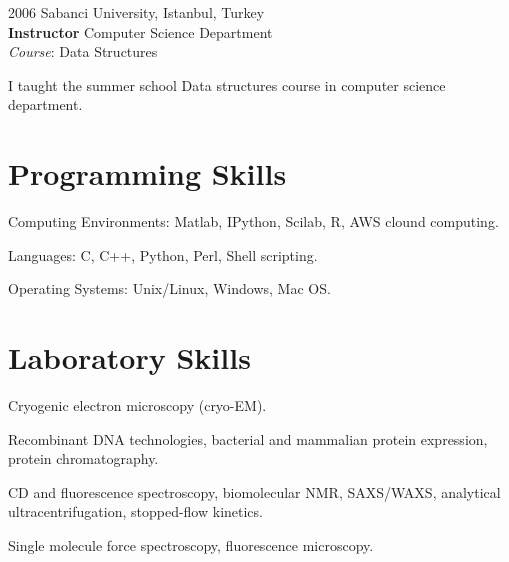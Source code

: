 \documentclass[12pt,letterpaper]{report}
\newcommand{\listitemspace}{0.25em}
\renewenvironment{itemize}
{\begin{list}{}{\setlength{\leftmargin}{0em}
                \setlength{\parskip}{0em}
                \setlength{\itemsep}{\listitemspace}
                \setlength{\parsep}{\listitemspace}}}
{\end{list}}
\begin{document}
\begin{tablist}
        \item[2006]\tab{}Sabanci University, Istanbul, Turkey \\
                             \textbf{Instructor} Computer Science Department\\
                             \textit{Course}: Data Structures
                             \begin{itemize}
                                \item \textbullet \hspace{0.2cm} I taught the summer school Data structures course in computer science department.
                            \end{itemize}

    \end{tablist}



    \section*{Programming Skills}
    \begin{itemize}
        \item \textbullet \hspace{0.2cm} Computing Environments: Matlab, IPython, Scilab, R, AWS clound computing.
        \item \textbullet \hspace{0.2cm} Languages: C, C++, Python, Perl, Shell scripting.
        \item \textbullet \hspace{0.2cm} Operating Systems: Unix/Linux, Windows, Mac OS.
    \end{itemize}

    \section*{Laboratory Skills}
    \begin{itemize}
        \item \textbullet \hspace{0.2cm} Cryogenic electron microscopy (cryo-EM).
        \item \textbullet \hspace{0.2cm} Recombinant DNA technologies, bacterial and mammalian protein expression, protein chromatography.
        \item \textbullet \hspace{0.2cm} CD and fluorescence spectroscopy, biomolecular NMR, SAXS/WAXS, analytical ultracentrifugation, stopped-flow kinetics.
        \item \textbullet \hspace{0.2cm} Single molecule force spectroscopy, fluorescence microscopy.
    \end{itemize}
\end{document}

